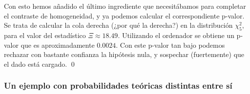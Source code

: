 \begin{ejemplo}
Con esto hemos añadido el último ingrediente que necesitábamos para completar el contraste de
homogeneidad, y ya podemos calcular el correspondiente p-valor. Se trata de calcular la cola
derecha (¿por qué la derecha?) en la distribución $\chi^2_5$, para el valor del estadístico
$\Xi\approx 18.49$. Utilizando el ordenador se obtiene un p-valor que es aproximadamente
$0.0024$. Con este p-valor tan bajo podemos rechazar con bastante confianza la hipótesis nula, y
sospechar (fuertemente) que el dado está cargado.
\qed
\end{ejemplo}


\subsubsection{Un ejemplo con probabilidades teóricas distintas entre sí}

